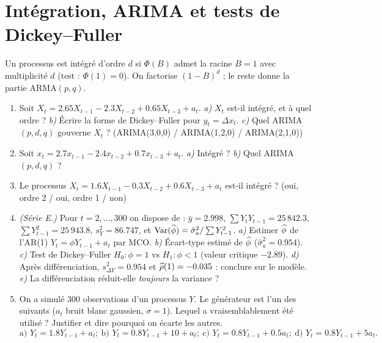 \documentclass[11pt]{article}
\begin{document}
\section{Intégration, ARIMA et tests de Dickey--Fuller}
\begin{contexte}
Un processus est intégré d'ordre $d$ si $\Phi(B)$ admet la racine $B=1$ avec multiplicité $d$
(test : $\Phi(1)=0$). On factorise $(1-B)^d$ ; le reste donne la partie ARMA$(p,q)$.
\end{contexte}
\begin{enumerate}[label=\textbf{Q\,F.\arabic*},leftmargin=*]
\item Soit $X_t=2.65X_{t-1}-2.3X_{t-2}+0.65X_{t-3}+a_t$. \emph{a)} $X_t$ est-il intégré, et à
quel ordre ? \emph{b)} Écrire la forme de Dickey--Fuller pour $y_t=\Delta x_t$. \emph{c)}
Quel ARIMA$(p,d,q)$ gouverne $X_t$ ? (ARIMA(3,0,0) / ARIMA(1,2,0) / ARIMA(2,1,0))

\item Soit $x_t=2.7x_{t-1}-2.4x_{t-2}+0.7x_{t-3}+a_t$. \emph{a)} Intégré ? \emph{b)} Quel
ARIMA$(p,d,q)$ ?

\item Le processus $X_t=1.6X_{t-1}-0.3X_{t-2}+0.6X_{t-3}+a_t$ est-il intégré ?
(oui, ordre 2 / oui, ordre 1 / non)

\item \emph{(Série E.)} Pour $t=2,\dots,300$ on dispose de : $\bar y=2.998$,
$\sum Y_tY_{t-1}=25\,842.3$, $\sum Y_{t-1}^2=25\,943.8$, $s_Y^2=86.747$, et
$\operatorname{Var}(\widehat{\phi})=\hat\sigma_a^2/\sum Y_{t-1}^2$.
\emph{a)} Estimer $\widehat{\phi}$ de l'AR(1) $Y_t=\phi Y_{t-1}+a_t$ par MCO.
\emph{b)} Écart-type estimé de $\widehat{\phi}$ ($\hat\sigma_a^2=0.954$).
\emph{c)} Test de Dickey--Fuller $H_0:\phi=1$ vs $H_1:\phi<1$ (valeur critique $-2.89$).
\emph{d)} Après différenciation, $s_{\Delta Y}^2=0.954$ et $\widehat{\rho}(1)=-0.035$ : conclure sur
le modèle. \emph{e)} La différenciation réduit-elle \emph{toujours} la variance ?

\item On a simulé 300 observations d'un processus $Y$. Le générateur est l'un des suivants
($a_t$ bruit blanc gaussien, $\sigma=1$). Lequel a vraisemblablement été utilisé ? Justifier
et dire pourquoi on écarte les autres.
\[
\text{a) }Y_t=1.8Y_{t-1}+a_t;\ \text{b) }Y_t=0.8Y_{t-1}+10+a_t;\
\text{c) }Y_t=0.8Y_{t-1}+0.5a_t;\ \text{d) }Y_t=0.8Y_{t-1}+5a_t.
\]
\end{enumerate}

\end{document}
